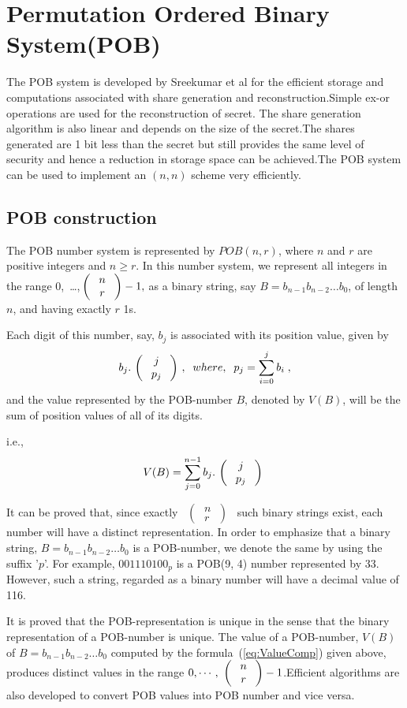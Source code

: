\documentclass{llncs}
\newcommand{\nCr}[2] {\mbox{ \( \left(\; \begin{array}{c}
                      #1 \\#2
               \end{array} \;
       \right) \) }}
\begin{document}
\section{Permutation Ordered Binary System(POB)} 
The POB system is developed by Sreekumar et al \cite{sreekumar2009efficient} for the efficient storage and computations associated with share generation and reconstruction.Simple ex-or operations are used for the reconstruction of secret. The share generation algorithm is also linear and depends on the size of the secret.The shares generated are 1 bit less than the secret but still provides the same level of security and hence a reduction in storage space can be achieved.The POB system can be used to implement an $(n,n)$ scheme very efficiently.
\subsection{POB construction}
 The POB number system is represented by $POB(n,r)$, where $n$ and $r$ are positive integers and $n \ge r $. In this number system, we  represent all integers in the range \mbox{0, \ldots,$\!\nCr{n}{r}\!\!-1,$} as a binary string, say $B = b_{n-1}b_{n-2}\ldots b_0$, of length $n$, and having exactly $r$ 1s.
 
 Each digit of this number, say, $b_j$ is associated with its position value, given by
 \[ b_j. \nCr{j}{p_j},\;\;
   where,  \;\;  p_j  =  \sum_{i = 0}^j b_i  \;, \]
 and the value represented by the POB-number $B$, denoted by $V(B)$, will be the sum of position values of all of its digits.
 
 i.e.,
 \begin{equation}
    V(B) =  \sum_{j = 0}^{n-1} b_j. \nCr{j}{p_j} \label{eq:ValueComp}
 \end{equation}
 
 It can be proved that, since exactly  \nCr{n}{r} such binary strings exist, each number will have a distinct representation. In order to emphasize that a binary string, $B = b_{n-1}b_{n-2}\ldots b_0$ is a POB-number, we denote the same by using the suffix '$p$'. For example, $001110100_p$ is a POB(9, 4) number represented by 33. However, such a string, regarded as a binary number will have a decimal value of 116.
 
It is  proved that the POB-representation is unique in the sense that the binary representation of a POB-number is unique.
 The value of a POB-number, $V(B)$ of  $B = b_{n-1}b_{n-2}\ldots b_0$ computed by the formula~(\ref{eq:ValueComp}) given above, produces distinct values in the range $0,\cdots,\nCr{n}{r}\!\!-1$.Efficient algorithms are also developed to convert POB values into POB number and vice versa.
\end{document}
